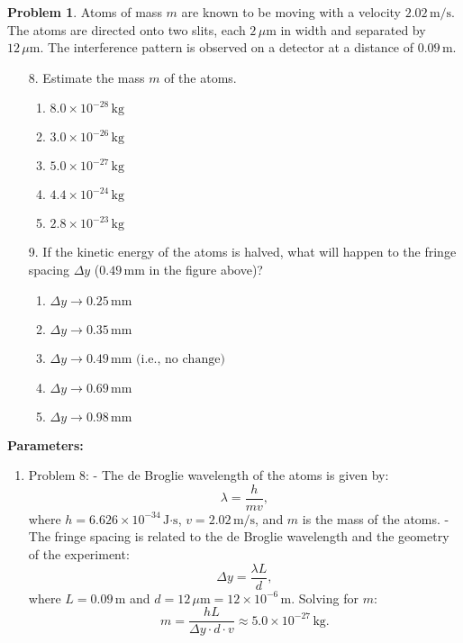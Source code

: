 \documentclass[12pt]{article}
\theoremstyle{definition} %
\newtheorem{problem}{Problem}
\theoremstyle{plain} %
\begin{document}
\begin{problem}
    
Atoms of mass \(m\) are known to be moving with a velocity \(2.02 \, \text{m/s}\). The atoms are directed onto two slits, each \(2 \, \mu\text{m}\) in width and separated by \(12 \, \mu\text{m}\). The interference pattern is observed on a detector at a distance of \(0.09 \, \text{m}\).

\begin{enumerate}
    \item[8.] Estimate the mass \(m\) of the atoms.
    \begin{enumerate}
        \item \(8.0 \times 10^{-28} \, \text{kg}\)
        \item \(3.0 \times 10^{-26} \, \text{kg}\)
        \item \textbf{\(5.0 \times 10^{-27} \, \text{kg}\)}
        \item \(4.4 \times 10^{-24} \, \text{kg}\)
        \item \(2.8 \times 10^{-23} \, \text{kg}\)
    \end{enumerate}

    \item[9.] If the kinetic energy of the atoms is halved, what will happen to the fringe spacing \(\Delta y\) (\(0.49 \, \text{mm}\) in the figure above)?
    \begin{enumerate}
        \item \(\Delta y \to 0.25 \, \text{mm}\)
        \item \(\Delta y \to 0.35 \, \text{mm}\)
        \item \(\Delta y \to 0.49 \, \text{mm (i.e., no change)}\)
        \item \textbf{\(\Delta y \to 0.69 \, \text{mm}\)}
        \item \(\Delta y \to 0.98 \, \text{mm}\)
    \end{enumerate}
\end{enumerate}

\textbf{Parameters:}
\begin{enumerate}
    \item Problem 8:
    - The de Broglie wavelength of the atoms is given by:
    $$
    \lambda = \frac{h}{mv},
    $$
    where \(h = 6.626 \times 10^{-34} \, \text{J·s}\), \(v = 2.02 \, \text{m/s}\), and \(m\) is the mass of the atoms.
    - The fringe spacing is related to the de Broglie wavelength and the geometry of the experiment:
    $$
    \Delta y = \frac{\lambda L}{d},
    $$
    where \(L = 0.09 \, \text{m}\) and \(d = 12 \, \mu\text{m} = 12 \times 10^{-6} \, \text{m}\). Solving for \(m\):
    $$
    m = \frac{hL}{\Delta y \cdot d \cdot v} \approx 5.0 \times 10^{-27} \, \text{kg}.
    $$


\end{enumerate}
\end{problem}
\end{document}
